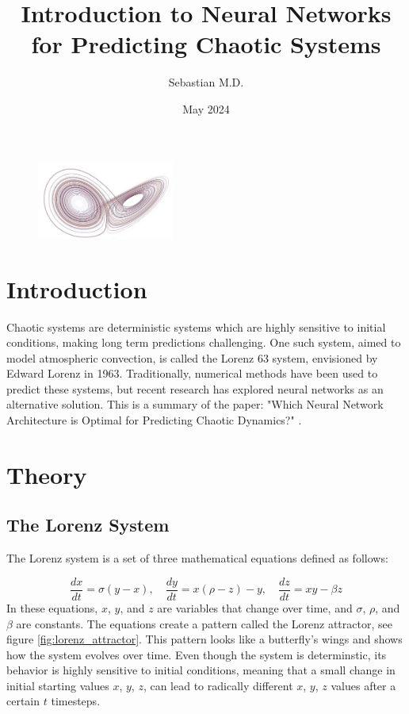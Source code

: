 \documentclass[11pt]{article}
\title{Introduction to Neural Networks for Predicting Chaotic Systems}
\author{Sebastian M.D.}
\date{May 2024}
\begin{document}
\maketitle

\begin{figure}[h]
\centering
\includegraphics[width=0.4\textwidth]{title_page_image.jpeg}
\end{figure}

\section{Introduction}

Chaotic systems are deterministic systems which are highly sensitive to initial conditions, making long term predictions challenging. One such system, aimed to model atmospheric convection, is called the Lorenz 63 system, envisioned by Edward Lorenz in 1963. Traditionally, numerical methods have been used to predict these systems, but recent research has explored neural networks as an alternative solution. This is a summary of the paper: "Which Neural Network Architecture is Optimal for Predicting Chaotic Dynamics?" \cite{neural-network-comparison}. 

\section{Theory}

\subsection{The Lorenz System}
The Lorenz system is a set of three mathematical equations defined as follows:

\[
\frac{dx}{dt} = \sigma(y - x), \quad \frac{dy}{dt} = x(\rho - z) - y, \quad \frac{dz}{dt} = xy - \beta z
\]
In these equations, $x$, $y$, and $z$ are variables that change over time, and $\sigma$, $\rho$, and $\beta$ are constants. The equations create a pattern called the Lorenz attractor, see figure \ref{fig:lorenz_attractor}. This pattern looks like a butterfly's wings and shows how the system evolves over time. Even though the system is determinstic, its behavior is highly sensitive to initial conditions, meaning that a small change in initial starting values $x$, $y$, $z$, can lead to radically different $x$, $y$, $z$ values after a certain $t$ timesteps. 
\end{document}
